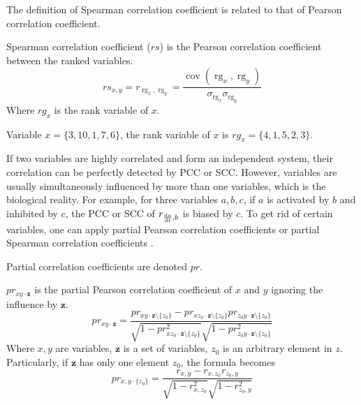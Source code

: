 The definition of Spearman correlation coefficient is related to that of Pearson correlation coefficient.

\begin{definition}
    Spearman correlation coefficient ($rs$) is the Pearson correlation coefficient between the ranked variables.
    $${\displaystyle rs_{x,y}=r_{\operatorname {rg} _{x},\operatorname {rg} _{y}}={\frac {\operatorname {cov} (\operatorname {rg} _{x},\operatorname {rg} _{y})}{\sigma _{\operatorname {rg} _{x}}\sigma _{\operatorname {rg} _{y}}}}}$$
    Where $rg_x$ is the rank variable of $x$.
\end{definition}

\begin{example}
Variable $x=\{3,10,1,7,6\}$, the rank variable of $x$ is $rg_x=\{4,1,5,2,3\}$.
\end{example}


If two variables are highly correlated and form an independent system, their correlation can be perfectly detected by PCC or SCC.
However, variables are usually simultaneously influenced by more than one variables, which is the biological reality.
For example, for three variables $a,b,c$, if $a$ is activated by $b$ and inhibited by $c$, the PCC or SCC of $r_{\frac{{\rm d}a}{{\rm d}t},b}$ is biased by $c$. 
To get rid of certain variables, one can apply partial Pearson correlation coefficients \cite{baba2004partial} or partial Spearman correlation coefficients \cite{borror2001practical}.

Partial correlation coefficients are denoted $pr$.

\begin{definition}\label{def:PPCC}
    $pr_{xy\cdot \mathbf {z}}$ is the partial Pearson correlation coefficient of $x$ and $y$ ignoring the influence by $\mathbf {z}$.
    $$pr _{xy\cdot \mathbf {z} }={\frac {pr _{xy\cdot \mathbf {z} \setminus \{z_{0}\}}-pr _{xz_{0}\cdot \mathbf {z} \setminus \{z_{0}\}}pr _{z_{0}y\cdot \mathbf {z} \setminus \{z_{0}\}}}{{\sqrt {1-pr _{xz_{0}\cdot \mathbf {z} \setminus \{z_{0}\}}^{2}}}{\sqrt {1-pr _{z_{0}y\cdot \mathbf {z} \setminus \{z_{0}\}}^{2}}}}}$$
    Where $x,y$ are variables, $\mathbf {z}$ is a set of variables, $z_0$ is an arbitrary element in $z$. 
    Particularly, if $\mathbf {z}$ has only one element $z_0$, the formula becomes
    $$pr_{x,y\cdot \{z_0\}}={\frac {r _{x,y}-r _{x,z_0}r _{z_0,y}}{{\sqrt {1-r _{x,z_0}^{2}}}{\sqrt {1-r _{z_0,y}^{2}}}}}$$

\end{definition}


